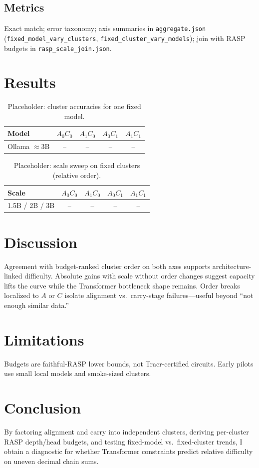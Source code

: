\documentclass[11pt]{article}
\begin{document}
\subsection{Metrics}
Exact match; error taxonomy; axis summaries in \texttt{aggregate.json}
(\texttt{fixed\_model\_vary\_clusters}, \texttt{fixed\_cluster\_vary\_models});
join with RASP budgets in \texttt{rasp\_scale\_join.json}.

\section{Results}

\begin{table}[t]
\centering
\caption{Placeholder: cluster accuracies for one fixed model.}
\label{tab:fixed-model}
\begin{tabular}{lcccc}
\toprule
Model & $A_0C_0$ & $A_1C_0$ & $A_0C_1$ & $A_1C_1$ \\
\midrule
Ollama $\approx$3B & -- & -- & -- & -- \\
\bottomrule
\end{tabular}
\end{table}

\begin{table}[t]
\centering
\caption{Placeholder: scale sweep on fixed clusters (relative order).}
\label{tab:fixed-clusters}
\begin{tabular}{lcccc}
\toprule
Scale & $A_0C_0$ & $A_1C_0$ & $A_0C_1$ & $A_1C_1$ \\
\midrule
1.5B / 2B / 3B & -- & -- & -- & -- \\
\bottomrule
\end{tabular}
\end{table}

\section{Discussion}
Agreement with budget-ranked cluster order on both axes supports architecture-linked
difficulty. Absolute gains with scale without order changes suggest capacity lifts the
curve while the Transformer bottleneck shape remains. Order breaks localized to $A$ or
$C$ isolate alignment vs.\ carry-stage failures---useful beyond ``not enough similar data.''

\section{Limitations}
Budgets are faithful-RASP lower bounds, not Tracr-certified circuits. Early pilots use
small local models and smoke-sized clusters.

\section{Conclusion}
By factoring alignment and carry into independent clusters, deriving per-cluster RASP
depth/head budgets, and testing fixed-model vs.\ fixed-cluster trends, I obtain a
diagnostic for whether Transformer constraints predict relative difficulty on uneven
decimal chain sums.



\end{document}
